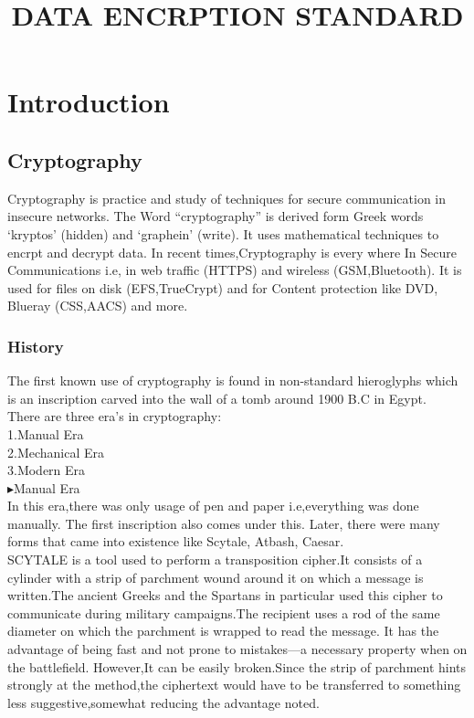 \documentclass[11pt]{article}
\title{DATA ENCRPTION STANDARD}
\author{}
\begin{document}
\maketitle

\section{Introduction}

\subsection{Cryptography}
\quad\quad Cryptography is practice and study of techniques for secure communication in insecure  networks.
The Word “cryptography” is derived form Greek words ‘kryptos’ (hidden) and ‘graphein’ (write).
\cite{Intro}
It uses mathematical techniques to encrpt and decrypt data.
In recent times,Cryptography is every where 
In Secure Communications  i.e,  in web traffic (HTTPS) and  wireless (GSM,Bluetooth).
 It is used for files on disk (EFS,TrueCrypt) and for Content protection like DVD, Blueray (CSS,AACS) and more.
 \subsubsection{History}
\quad\quad The first known use of cryptography is found in non-standard hieroglyphs which is an inscription carved into the wall of a tomb around 1900 B.C in Egypt.\\
 There are three era's in cryptography:\\
 1.Manual Era\\
 2.Mechanical Era\\
 3.Modern Era\\
 
 
 $\blacktriangleright${Manual Era}\\
 
    \quad In this era,there was only usage of pen and paper i.e,everything was done manually. The first inscription also comes under this. 
    Later, there were many forms that came into existence like Scytale, Atbash, Caesar.\\
         
         \quad SCYTALE is a tool used to perform a transposition cipher.It consists of a cylinder with a strip of parchment wound around it on which a message is written.The ancient Greeks and the Spartans in particular used this cipher to communicate during military campaigns.The recipient uses a rod of the same diameter on which the parchment is wrapped to read the message. It has the advantage of being fast and not prone to mistakes—a necessary property when on the battlefield. 
However,It can be easily broken.Since the strip of parchment hints strongly at the method,the ciphertext would have to be transferred to something less suggestive,somewhat reducing the advantage noted.\\
     
\end{document}
